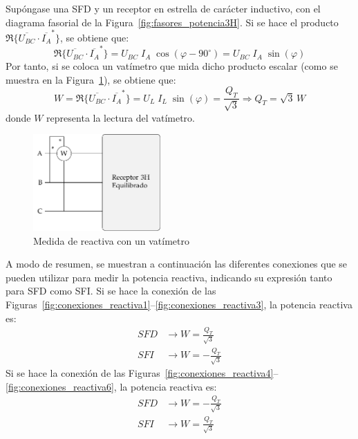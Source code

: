 Supóngase una SFD y un receptor en estrella de carácter inductivo, con el diagrama fasorial de la Figura~\ref{fig:fasores_potencia3H}. Si se hace el producto $\Re\{\overline{U_{BC}} \cdot \overline{I_A}^*\}$, se obtiene que:
\begin{equation*}
    \Re\{\overline{U_{BC}} \cdot \overline{I_A}^*\} = U_{BC}\;I_A\;\cos(\varphi-90^\circ)=U_{BC}\;I_A\;\sin(\varphi)
\end{equation*}
Por tanto, si se coloca un vatímetro que mida dicho producto escalar (como se muestra en la Figura~\ref{fig:Reactiva3H_A-BC}), se obtiene que: 
\begin{equation}
    W=\Re\{\overline{U_{BC}} \cdot \overline{I_A}^*\}=U_{L}\;I_L\;\sin(\varphi)=\dfrac{Q_T}{\sqrt{3}}\Rightarrow \boxed{Q_T=\sqrt{3}\,W}
\end{equation}
donde $W$ representa la lectura del vatímetro. 
\begin{figure}[H]
    \centering
    \includegraphics[height=3.7cm]{../figs/Reactiva3H_A-BC.pdf}
    \caption{Medida de reactiva con un vatímetro}
    \label{fig:Reactiva3H_A-BC}
\end{figure}

A modo de resumen, se muestran a continuación las diferentes conexiones que se pueden utilizar para medir la potencia reactiva, indicando su expresión tanto para SFD como SFI. Si se hace la conexión de las Figuras~\ref{fig:conexiones_reactiva1}--\ref{fig:conexiones_reactiva3}, la potencia reactiva es:
\begin{align}
SFD &\rightarrow \boxed{W = \frac{Q_T}{\sqrt{3}}}\\
SFI &\rightarrow \boxed{W =  - \frac{Q_T}{\sqrt{3}}}
\end{align}
Si se hace la conexión de las Figuras~\ref{fig:conexiones_reactiva4}--\ref{fig:conexiones_reactiva6}, la potencia reactiva es:
\begin{align}
SFD &\rightarrow \boxed{W = - \frac{Q_T}{\sqrt{3}}}\\
SFI &\rightarrow \boxed{W = \frac{Q_T}{\sqrt{3}}}
\end{align}

